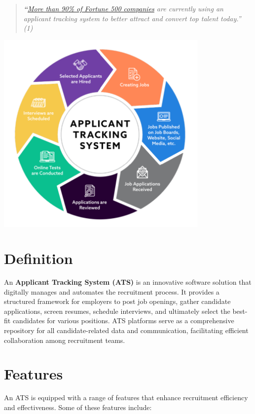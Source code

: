 \documentclass[
]{book}
\begin{document}
\begin{quote}
\emph{\textbf{``}\href{https://medium.com/swlh/90-of-fortune-500-companies-use-an-applicant-tracking-system-whats-it-5a6b6d25e5e7}{More than 90\% of Fortune 500 companies} are currently using an applicant tracking system to better attract and convert top talent today.'' (1)}
\end{quote}

\includegraphics[width=4.08333in,height=\textheight]{ats pic.png}

\hypertarget{definition}{%
\section{Definition}\label{definition}}

An \textbf{Applicant Tracking System (ATS)} is an innovative software solution that digitally manages and automates the recruitment process. It provides a structured framework for employers to post job openings, gather candidate applications, screen resumes, schedule interviews, and ultimately select the best-fit candidates for various positions. ATS platforms serve as a comprehensive repository for all candidate-related data and communication, facilitating efficient collaboration among recruitment teams.

\hypertarget{features}{%
\section{Features}\label{features}}

An ATS is equipped with a range of features that enhance recruitment efficiency and effectiveness. Some of these features include:
\end{document}
